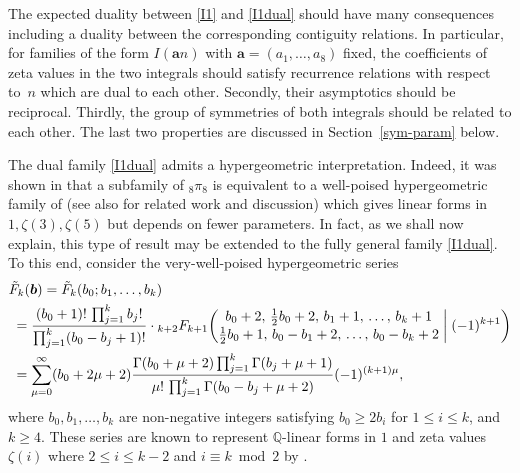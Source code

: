 \documentclass[12pt,reqno]{amsart}
\theoremstyle{remark}
\newcommand\ba{\boldsymbol a}
\newcommand\bb{\boldsymbol b}
\begin{document}
The expected  duality between \eqref{I1} and \eqref{I1dual} should have many consequences including a duality between the corresponding contiguity relations.  In particular, for families of the form $I(\ba n)$ with $\ba=(a_1,\dots, a_8)$ fixed, the  coefficients of  zeta values in the two integrals should satisfy recurrence relations with respect to~$n$ which are dual to each other.  Secondly, their asymptotics should be reciprocal. Thirdly, the group of symmetries of both integrals should be related to each other. The last two properties are discussed in Section~\ref{sym-param} below.

The dual family \eqref{I1dual} admits a hypergeometric interpretation. Indeed, 
it was shown in \cite{Br16}  that a subfamily  of  ${}_8\pi_8$ is equivalent to a well-poised hypergeometric family of \cite{Zu03} (see also \cite{BR01, CFR08, Fi04, KR07} for related work and discussion) which gives linear forms in $1,\zeta(3), \zeta(5)$ but depends on fewer parameters.  In fact, as we shall now explain, this type of result may be extended to the fully general family \eqref{I1dual}. To this end, 
consider  the  very-well-poised hypergeometric series
\begin{align}
&
\tilde F_k(\bb)
=\tilde F_k(b_0;b_1,\dots,b_k)
\nonumber\\ &\;
=\frac{(b_0+1)!\,\prod_{j=1}^k b_j!}{\prod_{j=1}^k(b_0-b_j+1)!}
\cdot{}_{k+2}F_{k+1}\biggl(\begin{matrix}
b_0+2, \, \tfrac12b_0+2, \, b_1+1, \, \dots, \, b_k+1 \\[1pt]
\tfrac12b_0+1, \, b_0-b_1+2, \, \dots, \, b_0-b_k+2
\end{matrix}\biggm|(-1)^{k+1}\biggr)
\nonumber\\ &\;
=\sum_{\mu=0}^\infty(b_0+2\mu+2)
\frac{\Gamma(b_0+\mu+2)\prod_{j=1}^k\Gamma(b_j+\mu+1)}{\mu!\,\prod_{j=1}^k\Gamma(b_0-b_j+\mu+2)}
(-1)^{(k+1)\mu},
\label{eq:10}
\end{align}
where $b_0,b_1,\dots,b_k$ are non-negative integers satisfying $b_0\ge2b_i$ for $1\leq i\leq k$, and $k\ge4$.  These series are known to represent $\mathbb Q$-linear forms in $1$ and zeta values $\zeta(i)$ where $2\le i\le k-2$ and $i\equiv k\bmod2$  by \cite[Sect.~3]{Zu03}.
\end{document}
